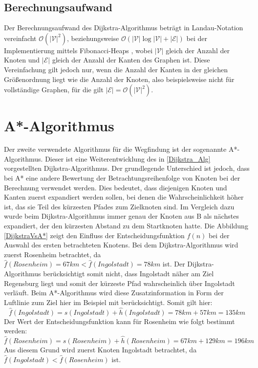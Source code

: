 	\subsection{Berechnungsaufwand}
		Der Berechnungsaufwand des Dijkstra-Algorithmus beträgt in Landau-Notation vereinfacht $\mathcal{O}(\lvert \mathcal{V}\rvert ^2)$, beziehungsweise $\mathcal{O}(\lvert \mathcal{V}\rvert  \log \lvert \mathcal{V}\rvert + \lvert \mathcal{E}\rvert) $ bei der Implementierung mittels Fibonacci-Heaps \cite{Fredman1984}, wobei  $\lvert \mathcal{V}\rvert$ gleich der Anzahl der Knoten  und $\lvert \mathcal{E}\rvert$ gleich der Anzahl der Kanten des Graphen ist. Diese Vereinfachung gilt jedoch nur, wenn die Anzahl der Kanten in der gleichen Größenordnung liegt wie die Anzahl der Knoten, also beispielsweise nicht für vollständige Graphen, für die gilt $\lvert \mathcal{E}\rvert =\mathcal{O}(\lvert \mathcal{V}\rvert ^2)$.
	
\section{A*-Algorithmus}
	Der zweite verwendete Algorithmus für die Wegfindung ist der sogenannte A*-Algorithmus. Dieser ist eine Weiterentwicklung des in \ref{Dijkstra_Alg} vorgestellten Dijkstra-Algorithmus. Der grundlegende Unterschied ist jedoch, dass bei A* eine andere Bewertung der Betrachtungsreihenfolge von Knoten bei der Berechnung verwendet werden. Dies bedeutet, dass diejenigen Knoten und Kanten zuerst expandiert werden sollen, bei denen die Wahrscheinlichkeit höher ist, das sie Teil des kürzesten Pfades zum Zielknoten sind. Im Vergleich dazu wurde beim Dijkstra-Algorithmus immer genau der Knoten aus B als nächstes expandiert, der den kürzesten Abstand zu dem Startknoten hatte. Die Abbildung \ref{DijkstraVsA*} zeigt den Einfluss der Entscheidungsfunktion $f(n)$ bei der Auswahl des ersten betrachteten Knotens. Bei dem Dijkstra-Algorithmus wird zuerst Rosenheim betrachtet, da $\hat{f}(Rosenheim)=67km<\hat{f}(Ingolstadt)=78km$ ist. Der Dijkstra-Algorithmus berücksichtigt somit nicht, dass Ingolstadt näher am Ziel Regensburg liegt und somit der kürzeste Pfad wahrscheinlich über Ingolstadt verläuft. Beim A*-Algorithmus wird diese Zusatzinformation in Form der Luftlinie zum Ziel hier im Beispiel mit berücksichtigt.
	Somit gilt hier:
	\begin{equation}
		\hat{f}(Ingolstadt)=s(Ingolstadt)+\hat{h}(Ingolstadt)=78km+57km=135km
	\end{equation}
	Der Wert der Entscheidungsfunktion kann für Rosenheim wie folgt bestimmt werden:
	\begin{equation}
		\hat{f}(Rosenheim)=s(Rosenheim)+\hat{h}(Rosenheim)=67km+129km=196km
	\end{equation}
	Aus diesem Grund wird zuerst Knoten Ingolstadt betrachtet, da $\hat{f}(Ingolstadt)<\hat{f}(Rosenheim)$ ist.
	
